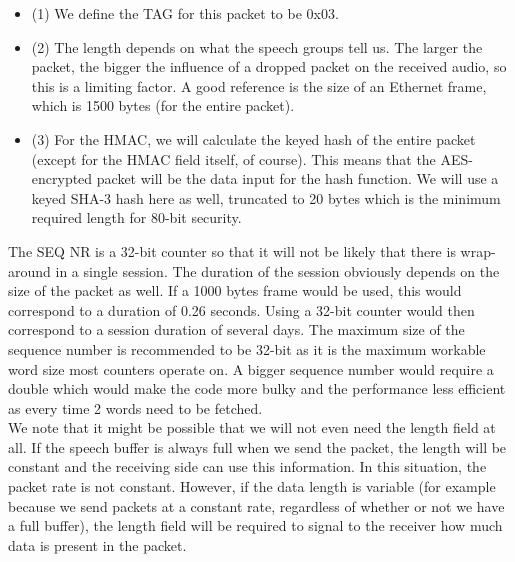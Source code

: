 \documentclass[a4paper]{article}
\begin{document}
\begin{itemize}
    \item (1) We define the TAG for this packet to be 0x03.
    \item (2) The length depends on what the speech groups tell us. The larger the packet, the bigger the influence of a dropped packet on the received audio, so this is a limiting factor. A good reference is the size of an Ethernet frame, which is 1500 bytes (for the entire packet).
    \item (3) For the HMAC, we will calculate the keyed hash of the entire packet (except for the HMAC field itself, of course). This means that the AES-encrypted packet will be the data input for the hash function. We will use a keyed SHA-3 hash here as well, truncated to 20 bytes which is the minimum required length for 80-bit security.
\end{itemize}

The SEQ NR is a 32-bit counter so that it will not be likely that there is wrap-around in a single session. The duration of the session obviously depends on the size of the packet as well. If a 1000 bytes frame would be used, this would correspond to a duration of 0.26 seconds. Using a 32-bit counter would then correspond to a session duration of several days. The maximum size of the sequence number is recommended to be 32-bit as it is the maximum workable word size most counters operate on. A bigger sequence number would require a double which would make the code more bulky and the performance less efficient as every time 2 words need to be fetched.\\

We note that it might be possible that we will not even need the length field at all. If the speech buffer is always full when we send the packet, the length will be constant and the receiving side can use this information. In this situation, the packet rate is not constant. However, if the data length is variable (for example because we send packets at a constant rate, regardless of whether or not we have a full buffer), the length field will be required to signal to the receiver how much data is present in the packet.
\end{document}
